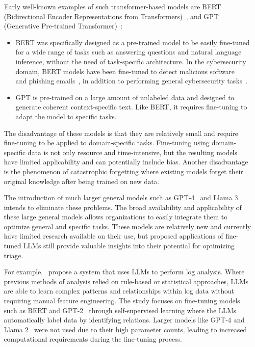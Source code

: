 Early well-known examples of such transformer-based models are BERT
(Bidirectional Encoder Representations from Transformers)\ \citep{devlin2018bert}, and
GPT (Generative Pre-trained Transformer)\ \citep{radford2018improving}:
\begin{itemize}
    \item BERT was specifically designed as a pre-trained model to be easily fine-tuned for a wide range of tasks such
    as answering questions and natural language inference, without the need of task-specific architecture.
    In the cybersecurity domain, BERT models have been fine-tuned to detect malicious
    software\ \citep{rahali2021malbert} and phishing emails\ \citep{lee2020catbert}, in addition to performing general
    cybersecurity tasks\ \citep{bayer2024cysecbert}.
    \item GPT is pre-trained on a large amount of unlabeled data and designed to generate coherent context-specific
    text.
    Like BERT, it requires fine-tuning to adapt the model to specific tasks.
\end{itemize}

The disadvantage of these models is that they are relatively small and require fine-tuning to be applied to
domain-specific tasks.
Fine-tuning using domain-specific data is not only resource and time-intensive, but the resulting models have limited
applicability and can potentially include bias.
Another disadvantage is the phenomenon of catastrophic forgetting where existing models forget their original knowledge
after being trained on new data.

The introduction of much larger general models such as GPT-4\ \citep{achiam2023gpt} and Llama 3\ \citep{meta:llama3}
intends to eliminate these problems.
The broad availability and applicability of these large general models allows organizations to easily integrate them to
optimize general and specific tasks.
These models are relatively new and currently have limited research available on their use, but proposed
applications of fine-tuned LLMs still provide valuable insights into their potential for optimizing triage.

For example,\ \citet{karlsen2024large} propose a system that uses LLMs to perform log analysis.
Where previous methods of analysis relied on rule-based or statistical approaches, LLMs are able to learn complex
patterns and relationships within log data without requiring manual feature engineering.
The study focuses on fine-tuning models such as BERT and GPT-2\ \citep{radford2019language} through self-supervised
learning where the LLMs automatically label data by identifying relations.
Larger models like GPT-4 and Llama 2\ \citep{touvron2023llama} were not used due to their high parameter counts,
leading to increased computational requirements during the fine-tuning process.

